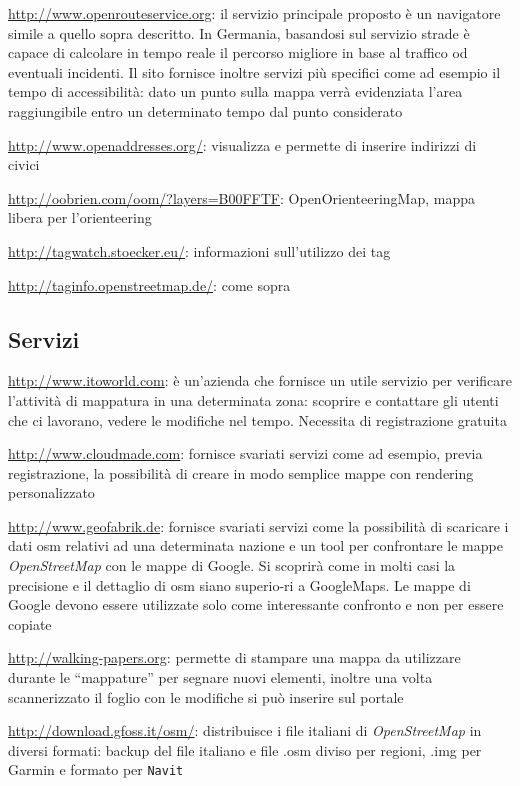 \documentclass[a4paper,twoside,12pt,]{article}
\newcommand{\osm}{\emph{OpenStreetMap}\xspace}
\newcommand{\soft}[1]{\texttt{#1}}
\begin{document}
\url{http://www.openrouteservice.org}: il servizio principale proposto è un navigatore simile a quello sopra descritto. In Germania, basandosi sul servizio strade è capace di calcolare in tempo reale il percorso migliore in base al traffico od eventuali incidenti. Il sito fornisce inoltre servizi più specifici come ad esempio il tempo di accessibilità: dato un punto sulla mappa verrà evidenziata l'area raggiungibile entro un determinato tempo dal punto considerato

\url{http://www.openaddresses.org/}: visualizza e permette di inserire indirizzi di civici

\url{http://oobrien.com/oom/?layers=B00FFTF}: OpenOrienteeringMap, mappa libera per l'orienteering

\url{http://tagwatch.stoecker.eu/}: informazioni sull'utilizzo dei tag

\url{http://taginfo.openstreetmap.de/}: come sopra

\subsection{Servizi}

\url{http://www.itoworld.com}: è un'azienda che fornisce un utile servizio per verificare l'attività di mappatura in una determinata zona: scoprire  e contattare gli utenti che ci lavorano, vedere le modifiche nel tempo. Necessita di registrazione gratuita

\url{http://www.cloudmade.com}: fornisce svariati servizi come ad esempio, previa registrazione, la possibilità di creare in modo semplice mappe con rendering personalizzato

\url{http://www.geofabrik.de}: fornisce svariati servizi come la possibilità di scaricare i dati osm relativi ad una determinata nazione e un tool per confrontare le mappe \osm con le mappe di Google. Si scoprirà come in molti casi la precisione e il dettaglio di osm siano superio-ri a GoogleMaps. Le mappe di Google devono essere utilizzate solo come interessante confronto e non per essere copiate

\url{http://walking-papers.org}: permette di stampare una mappa da utilizzare durante le ``mappature'' per segnare nuovi elementi, inoltre una volta scannerizzato il foglio con le modifiche si può inserire sul portale

\url{http://download.gfoss.it/osm/}: distribuisce i file italiani di \osm in diversi formati: backup del file italiano e file .osm diviso per regioni, .img per Garmin e formato per \soft{Navit}
\end{document}
